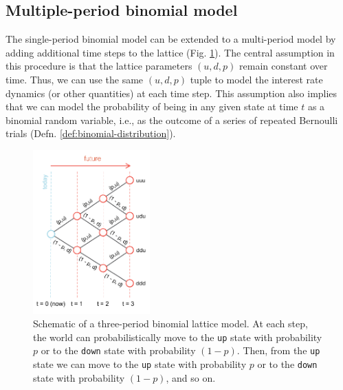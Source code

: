 \documentclass[11pt]{article}
\theoremstyle{definition}
\begin{document}
\clearpage

\subsection{Multiple-period binomial model}
The single-period binomial model can be extended to a multi-period model by adding additional time steps to the lattice (Fig. \ref{fig:example-multistep-binomial-lattice-schematic}).
The central assumption in this procedure is that the lattice parameters $(u,d,p)$ remain constant over time. 
Thus, we can use the same $(u,d,p)$ tuple to model the interest rate dynamics (or other quantities) at each time step.
This assumption also implies that we can model the probability of being in any given state at time $t$ as a binomial random variable, i.e., as the outcome of a series of repeated Bernoulli trials (Defn. \ref{def:binomial-distribution}).
\begin{figure}[h]
    \centering
    \includegraphics[width=0.40\textwidth]{./figs/Fig-ThreeStep-Binomial-Lattice-Schematic.pdf}
    \caption{Schematic of a three-period binomial lattice model. 
	At each step, the world can probabilistically move to the \texttt{up} state with probability $p$ or to the \texttt{down} state with probability $(1-p)$. 
	Then, from the \texttt{up} state we can move to the \texttt{up} state with probability $p$ or to the \texttt{down} state with probability $(1-p)$, and so on. 
	}\label{fig:example-multistep-binomial-lattice-schematic}
\end{figure}
\end{document}

